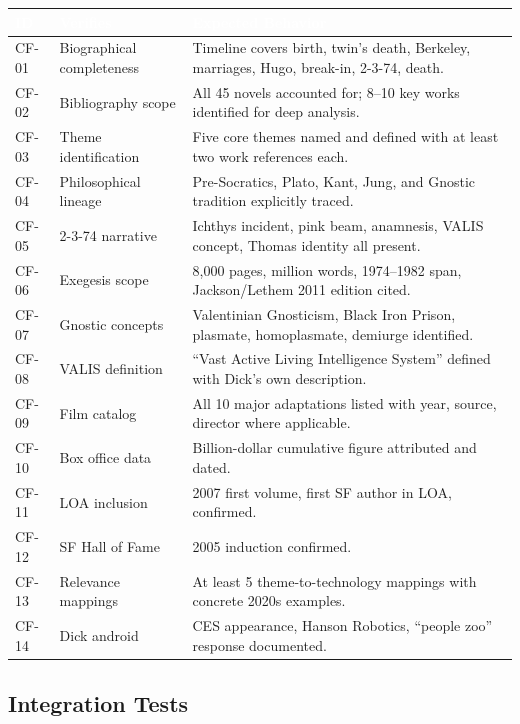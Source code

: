 \documentclass[11pt,letterpaper]{article}
\newcommand{\tableheader}[1]{\textbf{\sffamily\textcolor{white}{#1}}}
\begin{document}
\begin{center}
\begin{tabularx}{\textwidth}{C{1.2cm}L{3.5cm}X}
\toprule
{}
\tableheader{ID} & \tableheader{Verifies} & \tableheader{Expected Behavior} \\
\midrule
CF-01 & Biographical completeness & Timeline covers birth, twin's death, Berkeley, marriages, Hugo, break-in, 2-3-74, death. \\
CF-02 & Bibliography scope & All 45 novels accounted for; 8--10 key works identified for deep analysis. \\
CF-03 & Theme identification & Five core themes named and defined with at least two work references each. \\
CF-04 & Philosophical lineage & Pre-Socratics, Plato, Kant, Jung, and Gnostic tradition explicitly traced. \\
CF-05 & 2-3-74 narrative & Ichthys incident, pink beam, anamnesis, VALIS concept, Thomas identity all present. \\
CF-06 & Exegesis scope & 8,000 pages, million words, 1974--1982 span, Jackson/Lethem 2011 edition cited. \\
CF-07 & Gnostic concepts & Valentinian Gnosticism, Black Iron Prison, plasmate, homoplasmate, demiurge identified. \\
CF-08 & VALIS definition & ``Vast Active Living Intelligence System'' defined with Dick's own description. \\
CF-09 & Film catalog & All 10 major adaptations listed with year, source, director where applicable. \\
CF-10 & Box office data & Billion-dollar cumulative figure attributed and dated. \\
CF-11 & LOA inclusion & 2007 first volume, first SF author in LOA, confirmed. \\
CF-12 & SF Hall of Fame & 2005 induction confirmed. \\
CF-13 & Relevance mappings & At least 5 theme-to-technology mappings with concrete 2020s examples. \\
CF-14 & Dick android & CES appearance, Hanson Robotics, ``people zoo'' response documented. \\
\bottomrule
\end{tabularx}
\end{center}

\subsection{Integration Tests}
\end{document}

